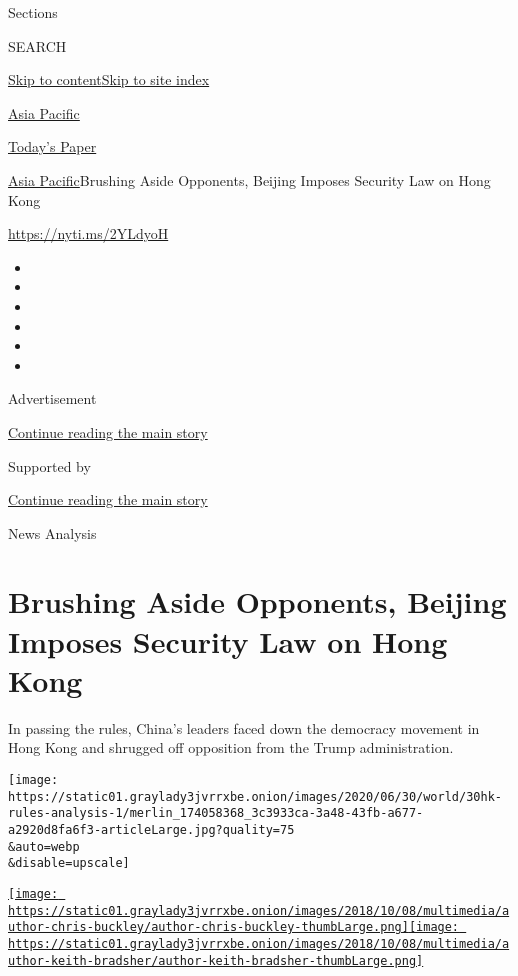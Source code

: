 Sections

SEARCH

\protect\hyperlink{site-content}{Skip to
content}\protect\hyperlink{site-index}{Skip to site index}

\href{https://www.nytimes3xbfgragh.onion/section/world/asia}{Asia
Pacific}

\href{https://myaccount.nytimes3xbfgragh.onion/auth/login?response_type=cookie\&client_id=vi}{}

\href{https://www.nytimes3xbfgragh.onion/section/todayspaper}{Today's
Paper}

\href{/section/world/asia}{Asia Pacific}\textbar{}Brushing Aside
Opponents, Beijing Imposes Security Law on Hong Kong

\url{https://nyti.ms/2YLdyoH}

\begin{itemize}
\item
\item
\item
\item
\item
\item
\end{itemize}

Advertisement

\protect\hyperlink{after-top}{Continue reading the main story}

Supported by

\protect\hyperlink{after-sponsor}{Continue reading the main story}

News Analysis

\hypertarget{brushing-aside-opponents-beijing-imposes-security-law-on-hong-kong}{%
\section{Brushing Aside Opponents, Beijing Imposes Security Law on Hong
Kong}\label{brushing-aside-opponents-beijing-imposes-security-law-on-hong-kong}}

In passing the rules, China's leaders faced down the democracy movement
in Hong Kong and shrugged off opposition from the Trump administration.

\texttt{[image: https://static01.graylady3jvrrxbe.onion/images/2020/06/30/world/30hk-rules-analysis-1/merlin\_174058368\_3c3933ca-3a48-43fb-a677-a2920d8fa6f3-articleLarge.jpg?quality=75\\\&auto=webp\\\&disable=upscale]}

\href{https://www.nytimes3xbfgragh.onion/by/chris-buckley}{\texttt{[image: https://static01.graylady3jvrrxbe.onion/images/2018/10/08/multimedia/author-chris-buckley/author-chris-buckley-thumbLarge.png]}}\href{https://www.nytimes3xbfgragh.onion/by/keith-bradsher}{\texttt{[image: https://static01.graylady3jvrrxbe.onion/images/2018/10/08/multimedia/author-keith-bradsher/author-keith-bradsher-thumbLarge.png]}}

